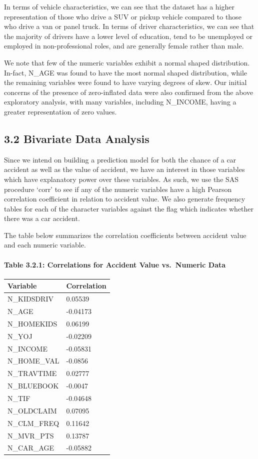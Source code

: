 \documentclass[]{article}
\let\oldparagraph\paragraph
\renewcommand{\paragraph}[1]{\oldparagraph{#1}\mbox{}}
\begin{document}
\newpage

In terms of vehicle characteristics, we can see that the dataset has a
higher representation of those who drive a SUV or pickup vehicle
compared to those who drive a van or panel truck. In terms of driver
characteristics, we can see that the majority of drivers have a lower
level of education, tend to be unemployed or employed in
non-professional roles, and are generally female rather than male.

We note that few of the numeric variables exhibit a normal shaped
distribution. In-fact, N\_AGE was found to have the most normal shaped
distribution, while the remaining variables were found to have varying
degrees of skew. Our initial concerns of the presence of zero-inflated
data were also confirmed from the above exploratory analysis, with many
variables, including N\_INCOME, having a greater representation of zero
values.

\subsection{3.2 Bivariate Data Analysis}\label{bivariate-data-analysis}

Since we intend on building a prediction model for both the chance of a
car accident as well as the value of accident, we have an interest in
those variables which have explanatory power over these variables. As
such, we use the SAS procedure `corr' to see if any of the numeric
variables have a high Pearson correlation coefficient in relation to
accident value. We also generate frequency tables for each of the
character variables against the flag which indicates whether there was a
car accident.

The table below summarizes the correlation coefficients between accident
value and each numeric variable.

\paragraph{Table 3.2.1: Correlations for Accident Value vs.~Numeric
Data}\label{table-3.2.1-correlations-for-accident-value-vs.numeric-data}

\begin{longtable}[]{@{}ll@{}}
\toprule
Variable & Correlation\tabularnewline
\midrule
\endhead
N\_KIDSDRIV & 0.05539\tabularnewline
N\_AGE & -0.04173\tabularnewline
N\_HOMEKIDS & 0.06199\tabularnewline
N\_YOJ & -0.02209\tabularnewline
N\_INCOME & -0.05831\tabularnewline
N\_HOME\_VAL & -0.0856\tabularnewline
N\_TRAVTIME & 0.02777\tabularnewline
N\_BLUEBOOK & -0.0047\tabularnewline
N\_TIF & -0.04648\tabularnewline
N\_OLDCLAIM & 0.07095\tabularnewline
N\_CLM\_FREQ & 0.11642\tabularnewline
N\_MVR\_PTS & 0.13787\tabularnewline
N\_CAR\_AGE & -0.05882\tabularnewline
\bottomrule
\end{longtable}
\end{document}
